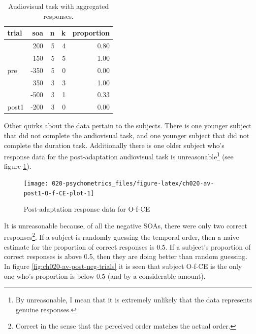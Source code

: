 \documentclass[11pt, oneside, openany]{scrbook}
\begin{document}
\begin{table}[!h]

\caption{\label{tab:ch020-av-bin-sample}Audiovisual task with aggregated responses.}
\centering
\begin{tabular}[t]{lrrrr}
\toprule
trial & soa & n & k & proportion\\
\midrule
 & 200 & 5 & 4 & 0.80\\
\cmidrule{2-5}
 & 150 & 5 & 5 & 1.00\\
\cmidrule{2-5}
\multirow[t]{-3}{*}{\raggedright\arraybackslash pre} & -350 & 5 & 0 & 0.00\\
\cmidrule{1-5}
 & 350 & 3 & 3 & 1.00\\
\cmidrule{2-5}
 & -500 & 3 & 1 & 0.33\\
\cmidrule{2-5}
\multirow[t]{-3}{*}{\raggedright\arraybackslash post1} & -200 & 3 & 0 & 0.00\\
\bottomrule
\end{tabular}
\end{table}

Other quirks about the data pertain to the subjects. There is one younger subject that did not complete the audiovisual task, and one younger subject that did not complete the duration task. Additionally there is one older subject who's response data for the post-adaptation audiovisual task is unreasonable\footnote{By unreasonable, I mean that it is extremely unlikely that the data represents genuine responses.} (see figure \ref{fig:ch020-av-post1-O-f-CE-plot}).

\begin{figure}

{\centering \texttt{[image: 020-psychometrics\_files/figure-latex/ch020-av-post1-O-f-CE-plot-1]} 

}

\caption{Post-adaptation response data for O-f-CE}\label{fig:ch020-av-post1-O-f-CE-plot}
\end{figure}

It is unreasonable because, of all the negative SOAs, there were only two correct responses\footnote{Correct in the sense that the perceived order matches the actual order.}. If a subject is randomly guessing the temporal order, then a naive estimate for the proportion of correct responses is 0.5. If a subject's proportion of correct responses is above 0.5, then they are doing better than random guessing. In figure \ref{fig:ch020-av-post-neg-trials} it is seen that subject O-f-CE is the only one who's proportion is below 0.5 (and by a considerable amount).
\end{document}
